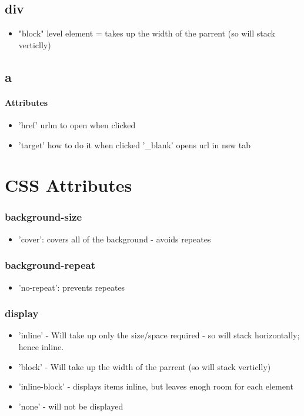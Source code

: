 \documentclass[]{article}
\begin{document}
\subsection{div}
\begin{itemize}
	\item "block" level element = takes up the width of the parrent (so will stack verticlly)
\end{itemize}

\subsection{a}
\paragraph{Attributes}
\begin{itemize}
	\item 'href' urlm to open when clicked
	\item 'target' how to do it when clicked
	\subitem '\_blank' opens url in new tab 
\end{itemize}


\section{CSS Attributes}
\subsubsection{background-size}
\begin{itemize}
	\item 'cover': covers all of the background - avoids repeates
\end{itemize}
\subsubsection{background-repeat}
\begin{itemize}
	\item 'no-repeat': prevents repeates
\end{itemize}

\subsubsection{display}
\begin{itemize}
	\item 'inline' - Will take up only the size/space required - so will stack horizontally; hence inline.
	\item 'block' - Will take up the width of the parrent (so will stack verticlly)
	\item 'inline-block' - displays items inline, but leaves enogh room for each element
	\item 'none' - will not be displayed
\end{itemize}
\end{document}
